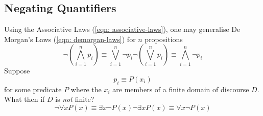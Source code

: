 \documentclass[twocolumn]{report}
\begin{document}
\subsection{Negating Quantifiers}
Using the Associative Laws (\ref{eqn: associative-laws}), one may generalise De Morgan's Laws (\ref{eqn: demorgan-laws}) for $n$ propositions
\begin{subequations}
	\begin{equation}
		\neg \left(\bigwedge_{i = 1}^{n} p_{i}\right) \equiv \bigvee_{i=1}^{n}\neg p_{i}
		\label{eqn: general-demorgan-1}
	\end{equation}
	\begin{equation}
		\neg \left(\bigvee_{i = 1}^{n} p_{i}\right) \equiv \bigwedge_{i=1}^{n}\neg p_{i}
		\label{eqn: general-demorgan-2}
	\end{equation}
	\label{eqn: general-demorgan-laws}
\end{subequations}
Suppose  
\[
	p_{i} \equiv P(x_{i})
\]
for some predicate $P$ where the $x_{i}$ are members of a finite domain of discourse $D$.
What then if $D$ is \textit{not} finite?
\begin{subequations}
	\begin{equation}
		\neg \forall xP(x) \equiv \exists x\neg P(x)
		\label{eqn: univeral-quantifier-negation}
	\end{equation}
	\begin{equation}
		\neg \exists xP(x) \equiv \forall x\neg P(x)
		\label{eqn: existential-quantifier-negation}
	\end{equation}
	\label{eqn: quantifier-negation}
\end{subequations}
\end{document}
